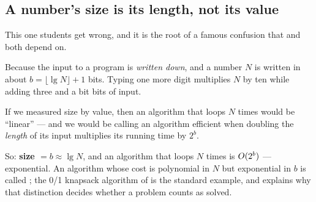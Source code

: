 \subsection*{A number's size is its length, not its value}

This one students get wrong, and it is the root of a famous confusion that
 and  both depend on.

\begin{alertbox}
Because the input to a program is \emph{written down}, and a number $N$ is
written in about $b = \lfloor \lg N \rfloor + 1$ bits. Typing one more digit
multiplies $N$ by ten while adding three and a bit bits of input.

\smallskip
If we measured size by value, then an algorithm that loops $N$ times would be
``linear'' --- and we would be calling an algorithm efficient when doubling the
\emph{length} of its input multiplies its running time by $2^{b}$.

\smallskip
So: \textbf{size $= b \approx \lg N$}, and an algorithm that loops $N$ times is
$O(2^{b})$ --- exponential. An algorithm whose cost is polynomial in $N$ but
exponential in $b$ is called ; the 0/1 knapsack
algorithm of  is the standard example, and 
explains why that distinction decides whether a problem counts as solved.
\end{alertbox}

